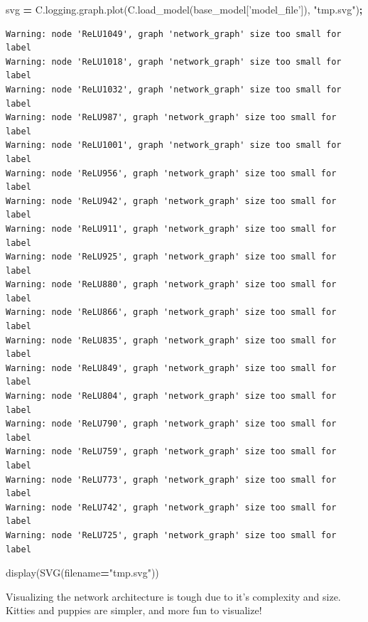 \documentclass[]{book}
\newenvironment{Shaded}{\begin{snugshade}}{\end{snugshade}}
\newcommand{\StringTok}[1]{\textcolor[rgb]{0.31,0.60,0.02}{#1}}
\newcommand{\OperatorTok}[1]{\textcolor[rgb]{0.81,0.36,0.00}{\textbf{#1}}}
\newcommand{\NormalTok}[1]{#1}
\theoremstyle{definition}
\theoremstyle{definition}
\theoremstyle{definition}
\theoremstyle{remark}
\begin{document}
\begin{Shaded}
\begin{Highlighting}[]
\NormalTok{svg }\OperatorTok{=}\NormalTok{ C.logging.graph.plot(C.load_model(base_model[}\StringTok{'model_file'}\NormalTok{]), }\StringTok{"tmp.svg"}\NormalTok{)}\OperatorTok{;}
\end{Highlighting}
\end{Shaded}

\begin{verbatim}
Warning: node 'ReLU1049', graph 'network_graph' size too small for label
Warning: node 'ReLU1018', graph 'network_graph' size too small for label
Warning: node 'ReLU1032', graph 'network_graph' size too small for label
Warning: node 'ReLU987', graph 'network_graph' size too small for label
Warning: node 'ReLU1001', graph 'network_graph' size too small for label
Warning: node 'ReLU956', graph 'network_graph' size too small for label
Warning: node 'ReLU942', graph 'network_graph' size too small for label
Warning: node 'ReLU911', graph 'network_graph' size too small for label
Warning: node 'ReLU925', graph 'network_graph' size too small for label
Warning: node 'ReLU880', graph 'network_graph' size too small for label
Warning: node 'ReLU866', graph 'network_graph' size too small for label
Warning: node 'ReLU835', graph 'network_graph' size too small for label
Warning: node 'ReLU849', graph 'network_graph' size too small for label
Warning: node 'ReLU804', graph 'network_graph' size too small for label
Warning: node 'ReLU790', graph 'network_graph' size too small for label
Warning: node 'ReLU759', graph 'network_graph' size too small for label
Warning: node 'ReLU773', graph 'network_graph' size too small for label
Warning: node 'ReLU742', graph 'network_graph' size too small for label
Warning: node 'ReLU725', graph 'network_graph' size too small for label
\end{verbatim}

\begin{Shaded}
\begin{Highlighting}[]
\NormalTok{display(SVG(filename}\OperatorTok{=}\StringTok{"tmp.svg"}\NormalTok{))}
\end{Highlighting}
\end{Shaded}

Visualizing the network architecture is tough due to it's complexity and
size. Kitties and puppies are simpler, and more fun to visualize!
\end{document}
